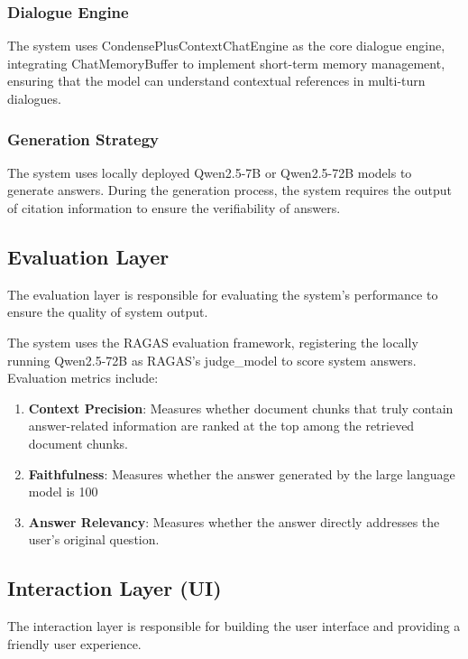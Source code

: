 \subsubsection{Dialogue Engine}
The system uses CondensePlusContextChatEngine as the core dialogue engine,
integrating ChatMemoryBuffer to implement short-term memory management,
ensuring that the model can understand contextual references in multi-turn
dialogues.

\subsubsection{Generation Strategy}
The system uses locally deployed Qwen2.5-7B or Qwen2.5-72B models to generate
answers. During the generation process, the system requires the output of
citation information to ensure the verifiability of answers.

\subsection{Evaluation Layer}

The evaluation layer is responsible for evaluating the system's performance to
ensure the quality of system output.

The system uses the RAGAS evaluation framework, registering the locally running
Qwen2.5-72B as RAGAS's judge\_model to score system answers. Evaluation metrics
include:

\begin{enumerate}
    \item \textbf{Context Precision}: Measures whether document chunks that truly contain answer-related information are ranked at the top among the retrieved document chunks.
    \item \textbf{Faithfulness}: Measures whether the answer generated by the large language model is 100%
    \item \textbf{Answer Relevancy}: Measures whether the answer directly addresses the user's original question.
\end{enumerate}

\subsection{Interaction Layer (UI)}

The interaction layer is responsible for building the user interface and
providing a friendly user experience.

